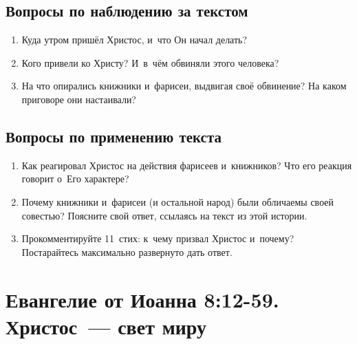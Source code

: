 \documentclass[a4paper,12pt]{article}
\begin{document}
\subsection*{Вопросы по наблюдению за текстом}
\begin{enumerate}
    \item Куда утром пришёл Христос, и~что Он начал делать? 
    
    \myline
    
    \myline
    \item Кого привели ко Христу? И~в~чём обвиняли этого человека? 
    
    \myline
    
    \myline
    \item На что опирались книжники и~фарисеи, выдвигая своё обвинение? На каком приговоре они настаивали? 
    
    \myline
    
    \myline
\end{enumerate}

\subsection*{Вопросы по применению текста} 
\begin{enumerate}
    \item Как реагировал Христос на действия фарисеев и~книжников? Что его реакция говорит о~Его характере? 
    
    \myline
    
    \myline
    \item Почему книжники и~фарисеи (и остальной народ) были обличаемы своей совестью? Поясните свой ответ, ссылаясь на текст из этой истории. 
    
    \myline
    
    \myline
    \item Прокомментируйте 11~стих: к~чему призвал Христос и~почему? Постарайтесь максимально развернуто дать ответ. 
    
    \myline
    
    \myline
\end{enumerate}



\section{Евангелие от Иоанна 8:12-59. Христос~--- свет миру}
\end{document}

